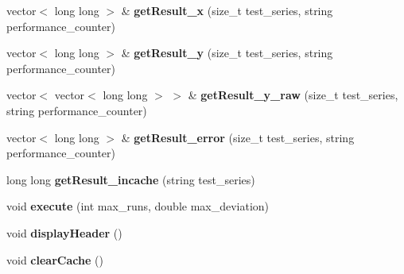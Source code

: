 \begin{DoxyCompactItemize}
\item 
\hypertarget{classAbstractBenchmark_a099548abc9223348e5936545b9556c08}{vector$<$ long long $>$ \& {\bfseries get\-Result\-\_\-x} (size\-\_\-t test\-\_\-series, string performance\-\_\-counter)}\label{classAbstractBenchmark_a099548abc9223348e5936545b9556c08}

\item 
\hypertarget{classAbstractBenchmark_a8f85ccc9dc5690337389bf05f23ed973}{vector$<$ long long $>$ \& {\bfseries get\-Result\-\_\-y} (size\-\_\-t test\-\_\-series, string performance\-\_\-counter)}\label{classAbstractBenchmark_a8f85ccc9dc5690337389bf05f23ed973}

\item 
\hypertarget{classAbstractBenchmark_ab2fa53b561d0c47f72c4790dd8f4c30d}{vector$<$ vector$<$ long long $>$ $>$ \& {\bfseries get\-Result\-\_\-y\-\_\-raw} (size\-\_\-t test\-\_\-series, string performance\-\_\-counter)}\label{classAbstractBenchmark_ab2fa53b561d0c47f72c4790dd8f4c30d}

\item 
\hypertarget{classAbstractBenchmark_af08295204070e1bb5a0f9c5540eecd11}{vector$<$ long long $>$ \& {\bfseries get\-Result\-\_\-error} (size\-\_\-t test\-\_\-series, string performance\-\_\-counter)}\label{classAbstractBenchmark_af08295204070e1bb5a0f9c5540eecd11}

\item 
\hypertarget{classAbstractBenchmark_a252e68ba970b78db2ffbbd8722ce09bc}{long long {\bfseries get\-Result\-\_\-incache} (string test\-\_\-series)}\label{classAbstractBenchmark_a252e68ba970b78db2ffbbd8722ce09bc}

\item 
\hypertarget{classAbstractBenchmark_a861f79562ef73b80402561ae53c3c7d8}{void {\bfseries execute} (int max\-\_\-runs, double max\-\_\-deviation)}\label{classAbstractBenchmark_a861f79562ef73b80402561ae53c3c7d8}

\item 
\hypertarget{classAbstractBenchmark_ad5847bd4da1ace35c58860813d8d9232}{void {\bfseries display\-Header} ()}\label{classAbstractBenchmark_ad5847bd4da1ace35c58860813d8d9232}

\item 
\hypertarget{classAbstractBenchmark_a1dc8b778b4fae628a1c537f674be0f93}{void {\bfseries clear\-Cache} ()}\label{classAbstractBenchmark_a1dc8b778b4fae628a1c537f674be0f93}

\end{DoxyCompactItemize}
